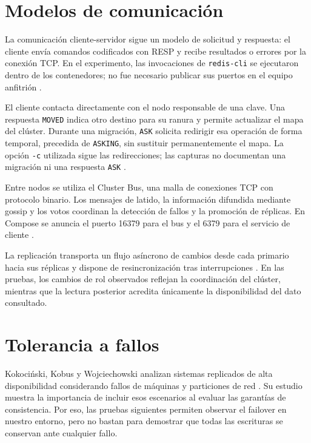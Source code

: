 \documentclass[12pt,a4paper]{article}
\begin{document}
\section{Modelos de comunicación}

La comunicación cliente-servidor sigue un modelo de solicitud y respuesta: el cliente envía comandos codificados con RESP y recibe resultados o errores por la conexión TCP. En el experimento, las invocaciones de \texttt{redis-cli} se ejecutaron dentro de los contenedores; no fue necesario publicar sus puertos en el equipo anfitrión \cite{redisResp}.

El cliente contacta directamente con el nodo responsable de una clave. Una respuesta \texttt{MOVED} indica otro destino para su ranura y permite actualizar el mapa del clúster. Durante una migración, \texttt{ASK} solicita redirigir esa operación de forma temporal, precedida de \texttt{ASKING}, sin sustituir permanentemente el mapa. La opción \texttt{-c} utilizada sigue las redirecciones; las capturas no documentan una migración ni una respuesta \texttt{ASK} \cite{redisClusterSpec}.

Entre nodos se utiliza el Cluster Bus, una malla de conexiones TCP con protocolo binario. Los mensajes de latido, la información difundida mediante gossip y los votos coordinan la detección de fallos y la promoción de réplicas. En Compose se anuncia el puerto 16379 para el bus y el 6379 para el servicio de cliente \cite{redisClusterSpec}.

La replicación transporta un flujo asíncrono de cambios desde cada primario hacia sus réplicas y dispone de resincronización tras interrupciones \cite{redisReplication}. En las pruebas, los cambios de rol observados reflejan la coordinación del clúster, mientras que la lectura posterior acredita únicamente la disponibilidad del dato consultado.

\section{Tolerancia a fallos}

Kokociński, Kobus y Wojciechowski analizan sistemas replicados de alta disponibilidad considerando fallos de máquinas y particiones de red \cite{kokocinski2023correctness}. Su estudio muestra la importancia de incluir esos escenarios al evaluar las garantías de consistencia. Por eso, las pruebas siguientes permiten observar el failover en nuestro entorno, pero no bastan para demostrar que todas las escrituras se conservan ante cualquier fallo.
\end{document}
